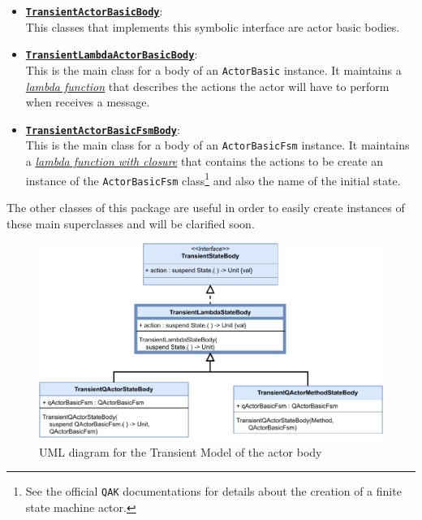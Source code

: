 \begin{itemize}
	\item 	\underline{\textbf{\texttt{TransientActorBasicBody}}}:\\
	This classes that implements this symbolic interface are actor basic bodies.
	
	\item 	\underline{\textbf{\texttt{TransientLambdaActorBasicBody}}}:\\
	This is the main class for a body of an \texttt{ActorBasic} instance. It maintains a \href{https://kotlinlang.org/docs/lambdas.html}{\textit{lambda function}} that describes the actions the actor will have to perform when receives a message.
	
	\item 	\underline{\textbf{\texttt{TransientActorBasicFsmBody}}}:\\
	This is the main class for a body of an \texttt{ActorBasicFsm} instance. It maintains a \href{https://kotlinlang.org/docs/lambdas.html#closures}{\textit{lambda function with closure}} that contains the actions to be create an instance of the \texttt{ActorBasicFsm} class\footnote{See the official \texttt{QAK} documentations for details about the creation of a finite state machine actor.} and also the name of the initial state.
\end{itemize}

The other classes of this package are useful in order to easily create instances of these main superclasses and will be clarified soon.

\begin{figure}[h]
	\centering
	\includegraphics[width=\textwidth]{img/[UML]it.unibo.kaktor.model.actorbody_onlystatebody}
	\caption{UML diagram for the Transient Model of the actor body}
	\label{fig::uml_model_state_body}
\end{figure}

